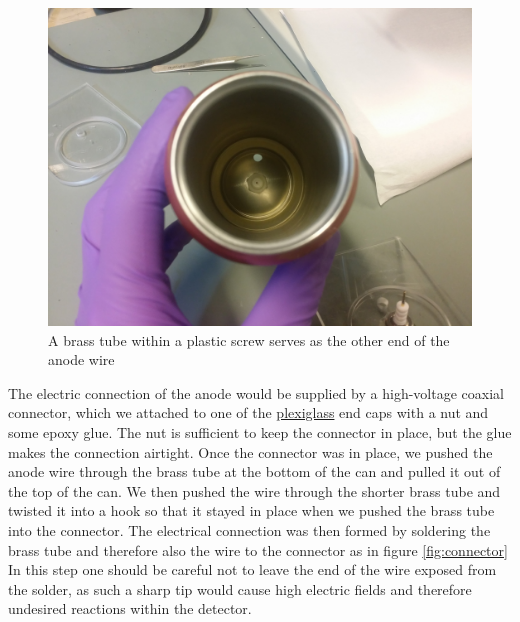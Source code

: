 \documentclass[a4paper]{article}
\begin{document}
\begin{figure}[ht!]
\centering
\includegraphics[width=\textwidth]{fig/IMG_20201123_103327.jpg}
\caption{A brass tube within a plastic screw serves as the other end of the anode wire}
\label{fig:anode_mounting}
\end{figure}

The electric connection of the anode would be supplied by a high-voltage coaxial connector, which we attached to one of the
\href{https://en.wikipedia.org/wiki/Poly(methyl_methacrylate)}{plexiglass}
end caps with a nut and some epoxy glue.
The nut is sufficient to keep the connector in place, but the glue makes the connection airtight.
Once the connector was in place, we pushed the anode wire through the brass tube at the bottom of the can and pulled it out of the top of the can.
We then pushed the wire through the shorter brass tube and twisted it into a hook so that it stayed in place when we pushed the brass tube into the connector.
The electrical connection was then formed by soldering the brass tube and therefore also the wire to the connector as in figure \ref{fig:connector}
In this step one should be careful not to leave the end of the wire exposed from the solder, as such a sharp tip would cause high electric fields and therefore undesired reactions within the detector.
\end{document}
